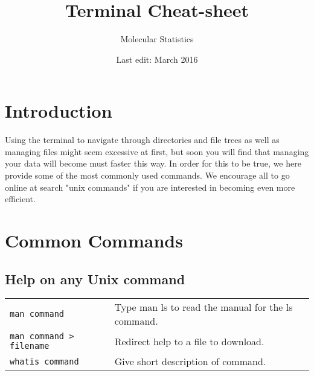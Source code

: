 \documentclass{article}
\title{Terminal Cheat-sheet}
\author{Molecular Statistics}
\date{Last edit: March 2016}
\begin{document}
\newcommand{\ti}[1]{\texttt{\textit{#1}}}
\renewcommand{\arraystretch}{2}


\maketitle

\section{Introduction}

Using the terminal to navigate through directories and file trees as well as managing files might seem excessive at first, but soon you will find that managing your data will become must faster this way. In order for this to be true, we here provide some of the most commonly used commands. We encourage all to go online at search "unix commands" if you are interested in becoming even more efficient. 

\section{Common Commands}
\subsection{Help on any Unix command}
\begin{table}[h]
\begin{tabular}{ll}
 	\texttt{man {command}} &	Type man ls to read the manual for the ls command. \\
	\texttt{man {command} > {filename}} &	Redirect help to a file to download. \\
	\texttt{whatis {command}} &	Give short description of command.\\
\end{tabular}
\end{table}
\end{document}
